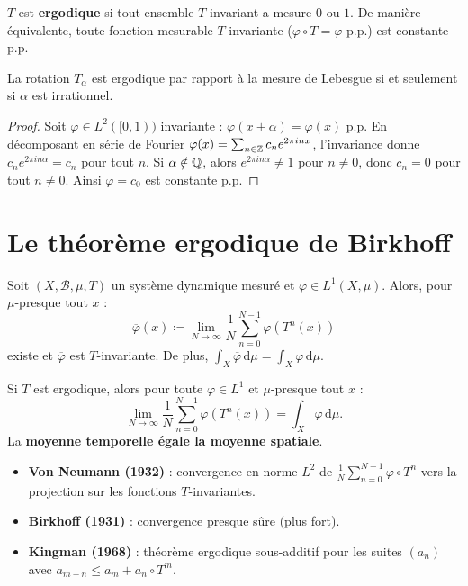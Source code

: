 \begin{definition}
$T$ est \textbf{ergodique} si tout ensemble $T$-invariant a mesure $0$ ou $1$.
De mani\`ere \'equivalente, toute fonction mesurable $T$-invariante
($\varphi \circ T = \varphi$ p.p.) est constante p.p.
\end{definition}

\begin{theoreme}
La rotation $T_\alpha$ est ergodique par rapport \`a la mesure de Lebesgue si
et seulement si $\alpha$ est irrationnel.
\end{theoreme}

\begin{proof}
Soit $\varphi \in L^2([0,1))$ invariante : $\varphi(x + \alpha) = \varphi(x)$ p.p.
En d\'ecomposant en s\'erie de Fourier $\varphi(x) = \sum_{n \in \mathbb{Z}} c_n e^{2\pi i n x}$,
l'invariance donne $c_n e^{2\pi i n \alpha} = c_n$ pour tout $n$. Si $\alpha \notin \mathbb{Q}$,
alors $e^{2\pi i n \alpha} \neq 1$ pour $n \neq 0$, donc $c_n = 0$ pour
tout $n \neq 0$. Ainsi $\varphi = c_0$ est constante p.p.
\end{proof}

\section{Le th\'eor\`eme ergodique de Birkhoff}

\begin{theoreme}[Birkhoff, 1931]
\label{thm:birkhoff}
Soit $(X, \mathcal{B}, \mu, T)$ un syst\`eme dynamique mesur\'e et
$\varphi \in L^1(X, \mu)$. Alors, pour $\mu$-presque tout $x$ :
\[
    \overline{\varphi}(x) \coloneqq \lim_{N \to \infty} \frac{1}{N}
    \sum_{n=0}^{N-1} \varphi(T^n(x))
\]
existe et $\overline{\varphi}$ est $T$-invariante. De plus,
$\int_X \overline{\varphi} \, \mathrm{d}\mu = \int_X \varphi \, \mathrm{d}\mu$.
\end{theoreme}

\begin{corollaire}
Si $T$ est ergodique, alors pour toute $\varphi \in L^1$ et $\mu$-presque
tout $x$ :
\[
    \lim_{N \to \infty} \frac{1}{N} \sum_{n=0}^{N-1} \varphi(T^n(x))
    = \int_X \varphi \, \mathrm{d}\mu.
\]
La \textbf{moyenne temporelle \'egale la moyenne spatiale}.
\end{corollaire}

\begin{formules}[title=\textbf{Th\'eor\`emes ergodiques fondamentaux}]
\begin{itemize}
    \item \textbf{Von Neumann (1932)} : convergence en norme $L^2$ de
    $\frac{1}{N}\sum_{n=0}^{N-1} \varphi \circ T^n$ vers la projection sur
    les fonctions $T$-invariantes.
    \item \textbf{Birkhoff (1931)} : convergence presque s\^ure (plus fort).
    \item \textbf{Kingman (1968)} : th\'eor\`eme ergodique sous-additif pour
    les suites $(a_n)$ avec $a_{m+n} \leq a_m + a_n \circ T^m$.
\end{itemize}
\end{formules}

